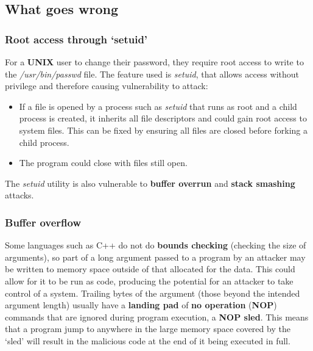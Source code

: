 \documentclass{article}
\begin{document}
\subsection{What goes wrong}

\subsubsection{Root access through `setuid'}
For a \textbf{UNIX} user to change their password, they require root access to write to the \textit{/usr/bin/passwd} file. The feature used is \textit{setuid}, that allows access without privilege and therefore causing vulnerability to attack:
\begin{itemize}
	\item If a file is opened by a process such as \textit{setuid} that runs as root and a child process is created, it inherits all file descriptors and could gain root access to system files. This can be fixed by ensuring all files are closed before forking a child process.
	\item The program could close with files still open. 
\end{itemize}
The \textit{setuid} utility is also vulnerable to \textbf{buffer overrun} and \textbf{stack smashing} attacks.

\subsubsection{Buffer overflow}
Some languages such as C++ do not do \textbf{bounds checking} (checking the size of arguments), so part of a long argument passed to a program by an attacker may be written to memory space outside of that allocated for the data. This could allow for it to be run as code, producing the potential for an attacker to take control of a system. Trailing bytes of the argument (those beyond the intended argument length) usually have a \textbf{landing pad} of \textbf{no operation} (\textbf{NOP}) commands that are ignored during program execution, a \textbf{NOP sled}. This means that a program jump to anywhere in the large memory space covered by the `sled' will result in the malicious code at the end of it being executed in full.
\end{document}
